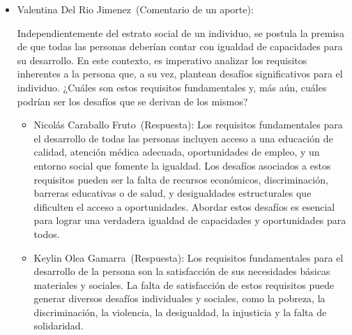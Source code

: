 \documentclass[letterpaper, 12pt]{article}
\newcommand{\liderValentina}{Valentina Del Rio Jimenez~}
\newcommand{\memberKeys}{Keylin Olea Gamarra~}
\newcommand{\memberNicolas}{Nicolás Caraballo Fruto~}
\begin{document}
\begin{itemize}[label=$\triangleright$]
            \begin{itemize}[label=$\diamond$]
                  \item \liderValentina (Comentario de un aporte):

                        Independientemente del estrato social de un individuo, se
                        postula la premisa de que todas las personas deberían
                        contar con igualdad de capacidades para su desarrollo. En
                        este contexto, es imperativo analizar los requisitos
                        inherentes a la persona que, a su vez, plantean desafíos
                        significativos para el individuo. ¿Cuáles son estos
                        requisitos fundamentales y, más aún, cuáles podrían ser los
                        desafíos que se derivan de los mismos?

                        \begin{itemize}
                              \item \memberNicolas (Respuesta):
                                    Los requisitos fundamentales para el desarrollo
                                    de todas las personas incluyen acceso a una
                                    educación de calidad, atención médica adecuada,
                                    oportunidades de empleo, y un entorno social que
                                    fomente la igualdad. Los desafíos asociados a
                                    estos requisitos pueden ser la falta de recursos
                                    económicos, discriminación, barreras educativas
                                    o de salud, y desigualdades estructurales que
                                    dificulten el acceso a oportunidades. Abordar
                                    estos desafíos es esencial para lograr una
                                    verdadera igualdad de capacidades y
                                    oportunidades para todos.

                              \item \memberKeys (Respuesta):
                                    Los requisitos fundamentales para el desarrollo
                                    de la persona son la satisfacción de sus
                                    necesidades básicas materiales y sociales.
                                    La falta de satisfacción de estos requisitos
                                    puede generar diversos desafíos individuales
                                    y sociales, como la pobreza, la discriminación,
                                    la violencia, la desigualdad, la injusticia y
                                    la falta de solidaridad.
                        \end{itemize}
            \end{itemize}


\end{itemize}
\end{document}
